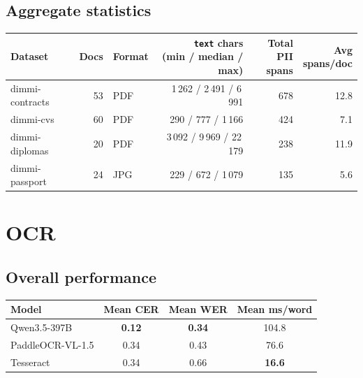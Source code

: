 \documentclass[11pt,a4paper]{article}
\begin{document}
\subsection{Aggregate statistics}

\begin{table}[H]
\centering
\small
\setlength{\tabcolsep}{5pt}
\begin{tabular}{lrlrrr}
\toprule
\textbf{Dataset} & \textbf{Docs} & \textbf{Format} & \makecell[c]{\textbf{\texttt{text} chars}\\\textbf{(min / median / max)}} & \makecell[c]{\textbf{Total}\\\textbf{PII spans}} & \makecell[c]{\textbf{Avg}\\\textbf{spans/doc}} \\
\midrule
dimmi-contracts & 53 & PDF & 1\,262 / 2\,491 / 6\,991  & 678 & 12.8 \\
dimmi-cvs       & 60 & PDF & 290 / 777 / 1\,166        & 424 & 7.1  \\
dimmi-diplomas  & 20 & PDF & 3\,092 / 9\,969 / 22\,179 & 238 & 11.9 \\
dimmi-passport  & 24 & JPG & 229 / 672 / 1\,079        & 135 & 5.6  \\
\bottomrule
\end{tabular}
\end{table}

\section{OCR}

\subsection{Overall performance}

\begin{table}[H]
\centering
\begin{tabular}{lccc}
\toprule
\textbf{Model} & \textbf{Mean CER} & \textbf{Mean WER} & \textbf{Mean ms/word} \\
\midrule
Qwen3.5-397B     & \textbf{0.12} & \textbf{0.34} & 104.8 \\
PaddleOCR-VL-1.5 & 0.34          & 0.43          & 76.6 \\
Tesseract        & 0.34          & 0.66          & \textbf{16.6} \\
\bottomrule
\end{tabular}
\end{table}
\end{document}
